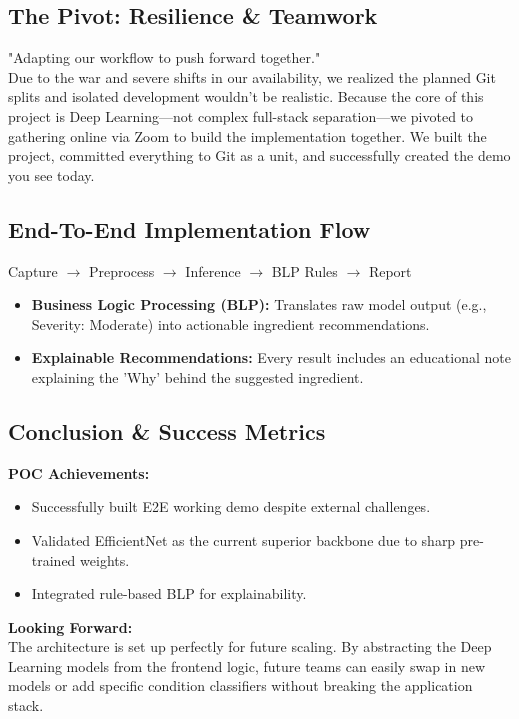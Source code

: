 \documentclass[12pt,a4paper]{article}
\begin{document}
\subsection{The Pivot: Resilience \& Teamwork}
"Adapting our workflow to push forward together."\\
Due to the war and severe shifts in our availability, we realized the planned Git splits and isolated development wouldn't be realistic. Because the core of this project is Deep Learning—not complex full-stack separation—we pivoted to gathering online via Zoom to build the implementation together. We built the project, committed everything to Git as a unit, and successfully created the demo you see today.

\subsection{End-To-End Implementation Flow}
Capture $\rightarrow$ Preprocess $\rightarrow$ Inference $\rightarrow$ BLP Rules $\rightarrow$ Report
\begin{itemize}
    \item \textbf{Business Logic Processing (BLP):} Translates raw model output (e.g., Severity: Moderate) into actionable ingredient recommendations.
    \item \textbf{Explainable Recommendations:} Every result includes an educational note explaining the 'Why' behind the suggested ingredient.
\end{itemize}

\subsection{Conclusion \& Success Metrics}
\textbf{POC Achievements:}
\begin{itemize}
    \item Successfully built E2E working demo despite external challenges.
    \item Validated EfficientNet as the current superior backbone due to sharp pre-trained weights.
    \item Integrated rule-based BLP for explainability.
\end{itemize}
\textbf{Looking Forward:}\\
The architecture is set up perfectly for future scaling. By abstracting the Deep Learning models from the frontend logic, future teams can easily swap in new models or add specific condition classifiers without breaking the application stack.
\end{document}
